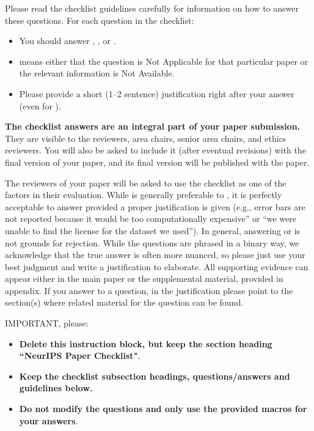 \documentclass{article}
\begin{document}
Please read the checklist guidelines carefully for information on how to answer these questions. For each question in the checklist:
\begin{itemize}
    \item You should answer \answerYes{}, \answerNo{}, or \answerNA{}.
    \item \answerNA{} means either that the question is Not Applicable for that particular paper or the relevant information is Not Available.
    \item Please provide a short (1--2 sentence) justification right after your answer (even for \answerNA). 
\end{itemize}

{\bf The checklist answers are an integral part of your paper submission.} They are visible to the reviewers, area chairs, senior area chairs, and ethics reviewers. You will also be asked to include it (after eventual revisions) with the final version of your paper, and its final version will be published with the paper.

The reviewers of your paper will be asked to use the checklist as one of the factors in their evaluation. While \answerYes{} is generally preferable to \answerNo{}, it is perfectly acceptable to answer \answerNo{} provided a proper justification is given (e.g., error bars are not reported because it would be too computationally expensive'' or ``we were unable to find the license for the dataset we used''). In general, answering \answerNo{} or \answerNA{} is not grounds for rejection. While the questions are phrased in a binary way, we acknowledge that the true answer is often more nuanced, so please just use your best judgment and write a justification to elaborate. All supporting evidence can appear either in the main paper or the supplemental material, provided in appendix. If you answer \answerYes{} to a question, in the justification please point to the section(s) where related material for the question can be found.

IMPORTANT, please:
\begin{itemize}
    \item {\bf Delete this instruction block, but keep the section heading ``NeurIPS Paper Checklist"},
    \item  {\bf Keep the checklist subsection headings, questions/answers and guidelines below.}
    \item {\bf Do not modify the questions and only use the provided macros for your answers}.
\end{itemize} 
 
\end{document}
